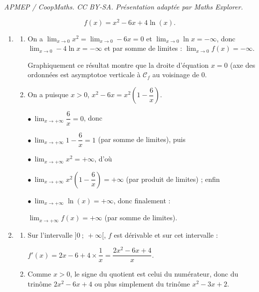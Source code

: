 \documentclass[10pt]{article}
\begin{document}
\noindent\textit{APMEP / CoopMaths. CC BY-SA. Présentation adaptée par Maths Explorer.}\par\medskip
\medskip







\[f(x) = x^2 - 6x + 4\ln (x).\]







\medskip

\begin{enumerate}
\item 
	\begin{enumerate}
		\item 
On a $\displaystyle\lim_{x \to 0} x^2 = \displaystyle\lim_{x \to 0} - 6x = 0$ et $\displaystyle\lim_{x \to 0} \ln x = - \infty$, donc $\displaystyle\lim_{x \to 0} - 4\ln x = - \infty$ et par somme de limites : $\displaystyle\lim_{x \to 0} f(x) = - \infty$.
	

Graphiquement ce résultat montre que la droite d'équation $x = 0$ (axe des ordonnées est asymptotoe verticale à $\mathcal{C}_f$  au voisinage de 0.
		\item 
On a puisque $x > 0$, \: $x^2 - 6x = x^2\left(1 - \dfrac{6}{x}\right)$.

$\bullet~$$\displaystyle\lim_{x \to + \infty} \dfrac{6}{x} = 0$, donc 

$\bullet~$$\displaystyle\lim_{x \to + \infty} 1 - \dfrac{6}{x} = 1$ (par somme de limites), puis

$\bullet~$$\displaystyle\lim_{x \to + \infty} x^2 = + \infty$, d'où

$\bullet~$$\displaystyle\lim_{x \to + \infty}x^2\left(1 - \dfrac{6}{x}\right) = + \infty$ (par produit de limites) ; enfin 

$\bullet~$$\displaystyle\lim_{x \to + \infty}\ln (x) = + \infty$, donc finalement :

$\displaystyle\lim_{x \to + \infty}f(x) = + \infty$ (par somme de limites).
	\end{enumerate}	
\item
	\begin{enumerate}
		\item 
Sur l'intervalle $]0~;~+ \infty[$, \: $f$ est dérivable et sur cet intervalle :

$f'(x) = 2x - 6 + 4 \times \dfrac1x = \dfrac{2x^2 - 6x + 4}{x}$.
		\item 
Comme $x > 0$, le signe du quotient est celui du numérateur, donc du trinôme $2x^2 - 6x + 4$ ou plus simplement du trinôme $x^2 - 3x + 2$.


\end{enumerate}
\end{enumerate}
\end{document}
